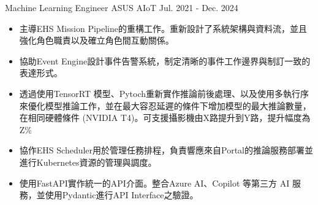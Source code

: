

\begin{cventries}


  \cventrynew
    {Machine Learning Engineer} %
    {ASUS AIoT} %
    {Jul. 2021 - Dec. 2024} %
    {
      \begin{cvitems} %
        \begin{itemize}
            \item 主導EHS Mission Pipeline的重構工作。重新設計了系統架構與資料流，並且強化角色職責以及確立角色間互動關係。
            \item 協助Event Engine設計事件告警系統，制定清晰的事件工作邊界與制訂一致的表達形式。
        \end{itemize}
        \begin{itemize}
            \item 透過使用TensorRT 模型、Pytoch重新實作推論前後處理、以及使用多執行序來優化模型推論工作，並在最大容忍延遲的條件下增加模型的最大推論數量，在相同硬體條件 (NVIDIA T4)。可支援攝影機由X路提升到Y路，提升幅度為Z\%
        \end{itemize}
        \begin{itemize}
            \item 協作EHS Scheduler用於管理任務排程，負責響應來自Portal的推論服務部署並進行Kubernetes資源的管理與調度。
        \end{itemize}
        \begin{itemize}
            \item 使用FastAPI實作統一的API介面。整合Azure AI、Copilot 等第三方 AI 服務，並使用Pydantic進行API Interface之驗證。

\end{itemize}
\end{cvitems}}
\end{cventries}

